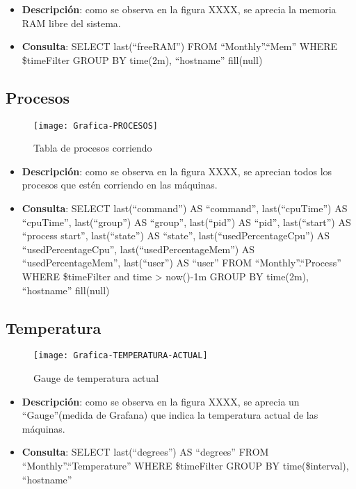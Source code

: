 \documentclass[ spanish, a4paper, 12pt, oneside]{report}
\begin{document}
\begin{itemize}
   \item \textbf{Descripción}: como se observa en la figura XXXX, se aprecia la memoria RAM libre del sistema.
   \item \textbf{Consulta}: SELECT last(``freeRAM'') FROM ``Monthly''.``Mem'' WHERE \$timeFilter GROUP BY time(2m), ``hostname'' fill(null)
\end{itemize}

\subsection{Procesos}

\begin{figure}[!h]
   \centering
   \texttt{[image: Grafica-PROCESOS]}\\
      \caption{\label{fig: Tabla de procesos corriendo} Tabla de procesos corriendo}
\end{figure}

\begin{itemize}
   \item \textbf{Descripción}: como se observa en la figura XXXX, se aprecian todos los procesos que estén corriendo en las máquinas.
   \item \textbf{Consulta}: SELECT last(``command'') AS ``command'', last(``cpuTime'') AS ``cpuTime'', last(``group'') AS ``group'', last(``pid'') AS ``pid'', last(``start'') AS ``process start'', last(``state'') AS ``state'', last(``usedPercentageCpu'') AS ``usedPercentageCpu'', last(``usedPercentageMem'') AS ``usedPercentageMem'', last(``user'') AS ``user'' FROM ``Monthly''.``Process'' WHERE \$timeFilter and time > now()-1m GROUP BY time(2m), ``hostname'' fill(null)
\end{itemize}

\subsection{Temperatura}

\begin{figure}[!h]
   \centering
   \texttt{[image: Grafica-TEMPERATURA-ACTUAL]}\\
      \caption{\label{fig: Gauge de temperatura actual} Gauge de temperatura actual}
\end{figure}

\begin{itemize}
   \item \textbf{Descripción}: como se observa en la figura XXXX, se aprecia un ``Gauge''(medida de Grafana) que indica la temperatura actual de las máquinas.
   \item \textbf{Consulta}: SELECT last(``degrees'') AS ``degrees'' FROM ``Monthly''.``Temperature'' WHERE \$timeFilter GROUP BY time(\$\textunderscore\textunderscore interval), ``hostname''
\end{itemize}
\end{document}
